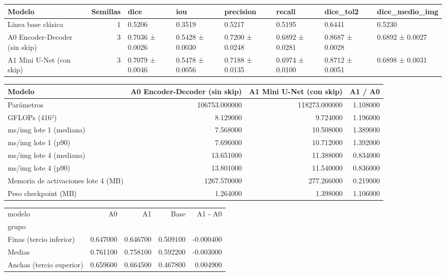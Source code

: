 \begin{tabular}{lrllllll}
\toprule
Modelo & Semillas & dice & iou & precision & recall & dice\_tol2 & dice\_medio\_img \\
\midrule
Línea base clásica & 1 & 0.5206 & 0.3519 & 0.5217 & 0.5195 & 0.6441 & 0.5230 \\
A0 Encoder-Decoder (sin skip) & 3 & 0.7036 ± 0.0026 & 0.5428 ± 0.0030 & 0.7200 ± 0.0248 & 0.6892 ± 0.0281 & 0.8687 ± 0.0028 & 0.6892 ± 0.0027 \\
A1 Mini U-Net (con skip) & 3 & 0.7079 ± 0.0046 & 0.5478 ± 0.0056 & 0.7188 ± 0.0135 & 0.6974 ± 0.0100 & 0.8712 ± 0.0051 & 0.6898 ± 0.0031 \\
\bottomrule
\end{tabular}

\begin{tabular}{lrrr}
\toprule
Modelo & A0 Encoder-Decoder (sin skip) & A1 Mini U-Net (con skip) & A1 / A0 \\
\midrule
Parámetros & 106753.000000 & 118273.000000 & 1.108000 \\
GFLOPs (416²) & 8.129000 & 9.724000 & 1.196000 \\
ms/img lote 1 (mediana) & 7.568000 & 10.508000 & 1.389000 \\
ms/img lote 1 (p90) & 7.696000 & 10.712000 & 1.392000 \\
ms/img lote 4 (mediana) & 13.651000 & 11.388000 & 0.834000 \\
ms/img lote 4 (p90) & 13.801000 & 11.540000 & 0.836000 \\
Memoria de activaciones lote 4 (MB) & 1267.570000 & 277.266000 & 0.219000 \\
Peso checkpoint (MB) & 1.264000 & 1.398000 & 1.106000 \\
\bottomrule
\end{tabular}

\begin{tabular}{lrrrr}
\toprule
modelo & A0 & A1 & Base & A1 - A0 \\
grupo &  &  &  &  \\
\midrule
Finas (tercio inferior) & 0.647000 & 0.646700 & 0.509100 & -0.000400 \\
Medias & 0.761100 & 0.758100 & 0.592200 & -0.003000 \\
Anchas (tercio superior) & 0.659600 & 0.664500 & 0.467800 & 0.004900 \\
\bottomrule
\end{tabular}

